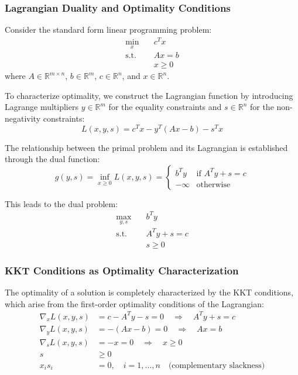 \subsubsection{Lagrangian Duality and Optimality Conditions}

Consider the standard form linear programming problem:
\begin{align}
\min_{x} \quad & c^T x \\
\text{s.t.} \quad & Ax = b \\
& x \geq 0
\end{align}
where $A \in \mathbb{R}^{m \times n}$, $b \in \mathbb{R}^m$, $c \in \mathbb{R}^n$, and $x \in \mathbb{R}^n$.

To characterize optimality, we construct the Lagrangian function by introducing Lagrange multipliers $y \in \mathbb{R}^m$ for the equality constraints and $s \in \mathbb{R}^n$ for the non-negativity constraints:
\begin{equation}
L(x, y, s) = c^T x - y^T(Ax - b) - s^T x
\end{equation}

The relationship between the primal problem and its Lagrangian is established through the dual function:
\begin{equation}
g(y, s) = \inf_{x \geq 0} L(x, y, s) = \begin{cases}
b^T y & \text{if } A^T y + s = c \\
-\infty & \text{otherwise}
\end{cases}
\end{equation}

This leads to the dual problem:
\begin{align}
\max_{y,s} \quad & b^T y \\
\text{s.t.} \quad & A^T y + s = c \\
& s \geq 0
\end{align}

\subsubsection{KKT Conditions as Optimality Characterization}

The optimality of a solution is completely characterized by the KKT conditions, which arise from the first-order optimality conditions of the Lagrangian:
\begin{align}
\nabla_x L(x, y, s) &= c - A^T y - s = 0 \quad \Rightarrow \quad A^T y + s = c \\
\nabla_y L(x, y, s) &= -(Ax - b) = 0 \quad \Rightarrow \quad Ax = b \\
\nabla_s L(x, y, s) &= -x = 0 \quad \Rightarrow \quad x \geq 0 \\
s &\geq 0 \\
x_i s_i &= 0, \quad i = 1, \ldots, n \quad \text{(complementary slackness)}
\end{align}

